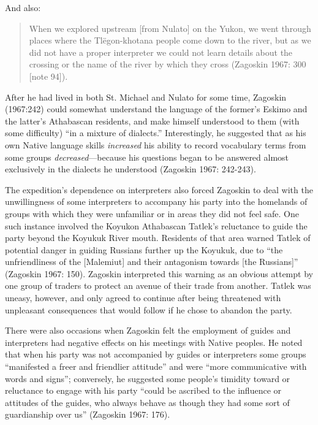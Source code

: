 \noindent
And also:

\begin{quote}
When we explored upstream [from Nulato] on the Yukon, we went through places where the Tlëgon-khotana people come down to the river, but as we did not have a proper interpreter we could not learn details about the crossing or the name of the river by which they cross (Zagoskin 1967: 300 [note 94]).
\end{quote}

After he had lived in both St. Michael and Nulato for some time, Zagoskin (1967:242) could somewhat understand the language of the former’s Eskimo and the latter’s Athabascan residents, and make himself understood to them (with some difficulty) “in a mixture of dialects.” Interestingly, he suggested that as his own Native language skills \textit{increased} his ability to record vocabulary terms from some groups \textit{decreased}---because his questions began to be answered almost exclusively in the dialects he understood (Zagoskin 1967: 242-243).

The expedition’s dependence on interpreters also forced Zagoskin to deal with the unwillingness of some interpreters to accompany his party into the homelands of groups with which they were unfamiliar or in areas they did not feel safe. One such instance involved the Koyukon Athabascan Tatlek’s reluctance to guide the party beyond the Koyukuk River mouth. Residents of that area warned Tatlek of potential danger in guiding Russians further up the Koyukuk, due to “the unfriendliness of the [Malemiut] and their antagonism towards [the Russians]” (Zagoskin 1967: 150). Zagoskin interpreted this warning as an obvious attempt by one group of traders to protect an avenue of their trade from another. Tatlek was uneasy, however, and only agreed to continue after being threatened with unpleasant consequences that would follow if he chose to abandon the party.

There were also occasions when Zagoskin felt the employment of guides and interpreters had negative effects on his meetings with Native peoples. He noted that when his party was not accompanied by guides or interpreters some groups “manifested a freer and friendlier attitude” and were “more communicative with words and signs”; conversely, he suggested some people’s timidity toward or reluctance to engage with his party “could be ascribed to the influence or attitudes of the guides, who always behave as though they had some sort of guardianship over us” (Zagoskin 1967: 176).

